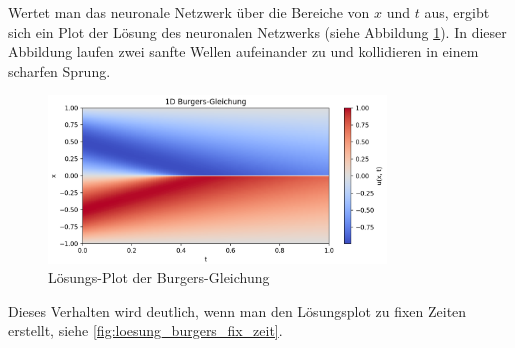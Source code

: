 Wertet man das neuronale Netzwerk über die Bereiche von \( x \) und \( t \) aus, ergibt sich ein Plot der Lösung des neuronalen Netzwerks (siehe Abbildung \ref{fig:loesung_burgers}).
In dieser Abbildung laufen zwei sanfte Wellen aufeinander zu und kollidieren in einem scharfen Sprung.
\begin{figure}
    \centering
    \includegraphics[width=0.8\textwidth]{papers/neuronal/images/prediction_burgers_net.png}
    \caption{Lösungs-Plot der Burgers-Gleichung}
    \label{fig:loesung_burgers}
\end{figure}
Dieses Verhalten wird deutlich, wenn man den Lösungsplot zu fixen Zeiten erstellt, siehe \ref{fig:loesung_burgers_fix_zeit}.
